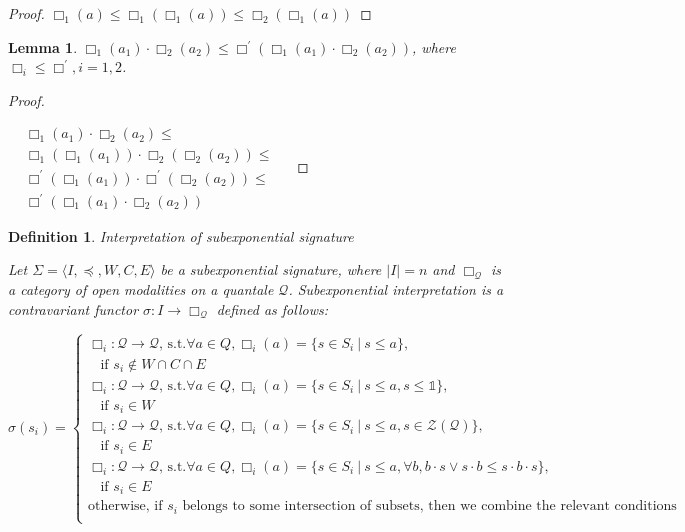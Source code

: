 \documentclass[a4paper]{article}
\newtheorem{lemma}{Lemma}
\newtheorem{defin}{Definition}
\begin{document}
\begin{proof}
  $\Box_1 (a) \leq \Box_1 (\Box_1 (a)) \leq \Box_2 (\Box_1 (a))$
\end{proof}

\begin{lemma}
  $\Box_1(a_1) \cdot \Box_2(a_2) \leq \Box^{'} (\Box_1(a_1) \cdot \Box_2(a_2))$, where $\Box_i \leq \Box^{'}, i = 1,2$.
\end{lemma}

\begin{proof}
$ $

  $\begin{array}{lll}
  &\Box_1(a_1) \cdot \Box_2(a_2) \leq & \\
  &\Box_1 (\Box_1 (a_1)) \cdot \Box_2 (\Box_2 (a_2)) \leq & \\
  &\Box^{'} (\Box_1 (a_1)) \cdot \Box^{'} (\Box_2 (a_2)) \leq & \\
  &\Box^{'}(\Box_1 (a_1) \cdot \Box_2 (a_2))&
  \end{array}$
\end{proof}

\begin{defin} Interpretation of subexponential signature

  Let $\Sigma = \langle I, \preceq, W, C, E \rangle$ be a subexponential signature, where $|I| = n$ and
  $\Box_{\mathcal{Q}}$ is a category of open modalities on a quantale $\mathcal{Q}$.
  Subexponential interpretation is a contravariant functor $\sigma : I \to \Box_{\mathcal{Q}}$ defined as follows:

  $\sigma(s_i) = \begin{cases}
  \Box_i : \mathcal{Q} \to \mathcal{Q} \text{, s.t.} \forall a \in Q, \Box_i(a) = \{ s \in S_i \: | \: s \leq a\},
  \\ \:\:\:\: \text{if $s_i \notin W \cap C \cap E$} \\
  \Box_i : \mathcal{Q} \to \mathcal{Q} \text{, s.t.} \forall a \in Q, \Box_i(a) = \{ s \in S_i \: | \: s \leq a, s \leq \mathds{1}\},
  \\ \:\:\:\: \text{if $s_i \in W$} \\
  \Box_i : \mathcal{Q} \to \mathcal{Q} \text{, s.t.} \forall a \in Q, \Box_i(a) = \{ s \in S_i \: | \: s \leq a, s \in \mathcal{Z}(\mathcal{Q}) \},
  \\ \:\:\:\: \text{if $s_i \in E$} \\
  \Box_i : \mathcal{Q} \to \mathcal{Q} \text{, s.t.} \forall a \in Q, \Box_i(a) = \{ s \in S_i \: | \: s \leq a, \forall b, b \cdot s \vee s \cdot b \leq s \cdot b \cdot s \},
  \\ \:\:\:\: \text{if $s_i \in E$} \\
  \text{otherwise, if $s_i$ belongs to some intersection of subsets, then we combine the relevant conditions } \\
  \end{cases}$
\end{defin}
\end{document}
